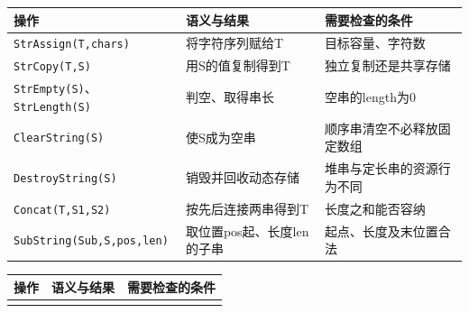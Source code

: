 \begin{wideblock}

\par\medskip\noindent\begin{minipage}{\linewidth}\fontsize{9.3}{12}\selectfont\begin{tabularx}{\linewidth}{@{}YYY@{}}
\toprule\noalign{}
\begin{minipage}[b]{\linewidth}\raggedright
操作
\end{minipage} & \begin{minipage}[b]{\linewidth}\raggedright
语义与结果
\end{minipage} & \begin{minipage}[b]{\linewidth}\raggedright
需要检查的条件
\end{minipage} \\
\midrule\noalign{}


\texttt{StrAssign(\allowbreak{}T,\allowbreak{}chars)\allowbreak{}} & 将字符序列赋给T & 目标容量、字符数 \\
\texttt{StrCopy(\allowbreak{}T,\allowbreak{}S)\allowbreak{}} & 用S的值复制得到T & 独立复制还是共享存储 \\
\texttt{StrEmpty(\allowbreak{}S)\allowbreak{}}、\texttt{StrLength(\allowbreak{}S)\allowbreak{}} & 判空、取得串长 & 空串的length为0 \\
\texttt{ClearString(\allowbreak{}S)\allowbreak{}} & 使S成为空串 & 顺序串清空不必释放固定数组 \\
\texttt{DestroyString(\allowbreak{}S)\allowbreak{}} & 销毁并回收动态存储 & 堆串与定长串的资源行为不同 \\
\texttt{Concat(\allowbreak{}T,\allowbreak{}S1,\allowbreak{}S2)\allowbreak{}} & 按先后连接两串得到T & 长度之和能否容纳 \\
\texttt{SubString(\allowbreak{}Sub,\allowbreak{}S,\allowbreak{}pos,\allowbreak{}len)\allowbreak{}} & 取位置pos起、长度len的子串 & 起点、长度及末位置合法 \\
\bottomrule\end{tabularx}
\end{minipage}\par\medskip

\par\medskip\noindent\begin{minipage}{\linewidth}\fontsize{9.3}{12}\selectfont\begin{tabularx}{\linewidth}{@{}YYY@{}}
\toprule\noalign{}
\begin{minipage}[b]{\linewidth}\raggedright
操作
\end{minipage} & \begin{minipage}[b]{\linewidth}\raggedright
语义与结果
\end{minipage} & \begin{minipage}[b]{\linewidth}\raggedright
需要检查的条件
\end{minipage} \\
\midrule\noalign{}



\end{tabularx}
\end{minipage}
\end{wideblock}
